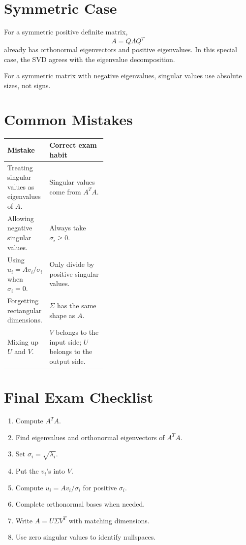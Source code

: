 \documentclass[10pt]{article}
\begin{document}
\section{Symmetric Case}

For a symmetric positive definite matrix,
\[
A=Q\Lambda Q^{T}
\]
already has orthonormal eigenvectors and positive eigenvalues. In this special case, the SVD agrees with the eigenvalue decomposition.

For a symmetric matrix with negative eigenvalues, singular values use absolute sizes, not signs.

\section{Common Mistakes}

\begin{center}
\small
\begin{tabularx}{\linewidth}{@{}L{0.40\linewidth}Y@{}}
\toprule
Mistake & Correct exam habit \\
\midrule
Treating singular values as eigenvalues of \(A\). & Singular values come from \(A^{T}A\). \\
Allowing negative singular values. & Always take \(\sigma_i\ge 0\). \\
Using \(u_i=Av_i/\sigma_i\) when \(\sigma_i=0\). & Only divide by positive singular values. \\
Forgetting rectangular dimensions. & \(\Sigma\) has the same shape as \(A\). \\
Mixing up \(U\) and \(V\). & \(V\) belongs to the input side; \(U\) belongs to the output side. \\
\bottomrule
\end{tabularx}
\end{center}

\section{Final Exam Checklist}

\begin{enumerate}
  \item Compute \(A^{T}A\).
  \item Find eigenvalues and orthonormal eigenvectors of \(A^{T}A\).
  \item Set \(\sigma_i=\sqrt{\lambda_i}\).
  \item Put the \(v_i\)'s into \(V\).
  \item Compute \(u_i=Av_i/\sigma_i\) for positive \(\sigma_i\).
  \item Complete orthonormal bases when needed.
  \item Write \(A=U\Sigma V^{T}\) with matching dimensions.
  \item Use zero singular values to identify nullspaces.
\end{enumerate}
\end{document}
